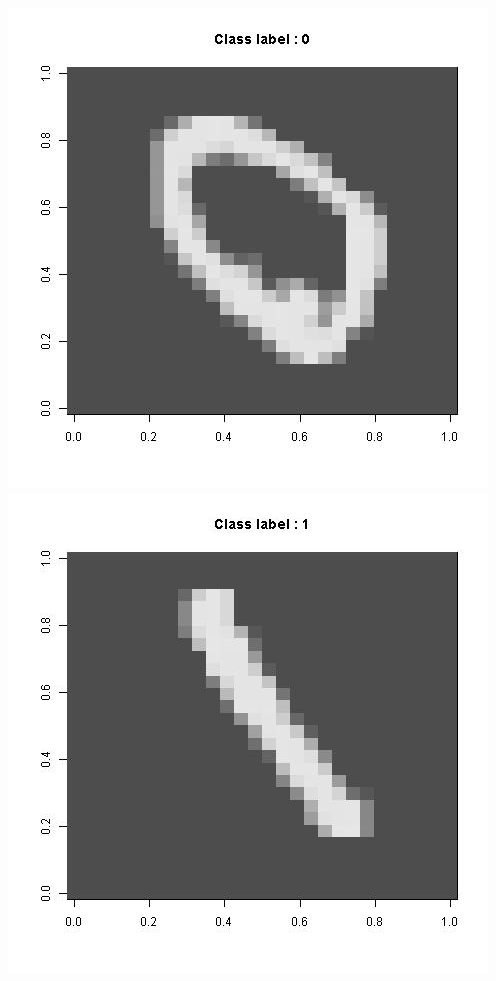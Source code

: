 \documentclass[a4paper]{article}
\begin{document}
\includegraphics{0.jpg} \\
\includegraphics{1.jpg} \\
\end{document}
